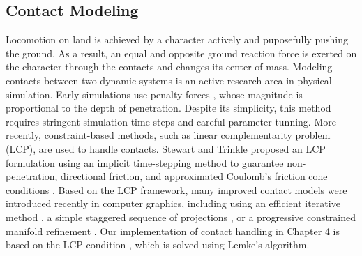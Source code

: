 \subsection{Contact Modeling}
Locomotion on land is achieved by a character actively and puposefully pushing the ground. As a result, an equal and opposite ground reaction force is exerted on the character through the contacts and changes its center of mass. Modeling contacts between two dynamic systems is an active research area in physical simulation. Early simulations use penalty forces \cite{Terzopoulos:1987}, whose magnitude is proportional to the depth of penetration. Despite its simplicity, this method requires stringent simulation time steps and careful parameter tunning. More recently, constraint-based methods, such as linear complementarity problem (LCP), are used to handle contacts. Stewart and Trinkle proposed an
LCP formulation using an implicit time-stepping method to guarantee
non-penetration, directional friction, and approximated Coulomb's
friction cone conditions \cite{Stewart:1996}. Based on the LCP
framework, many improved contact models were introduced recently in
computer graphics, including using an efficient iterative method
\cite{Erleben:2007}, a simple staggered sequence of projections
\cite{Kaufman:2008}, or a progressive constrained manifold
refinement \cite{Otaduy:2009}. Our implementation of contact handling in Chapter 4 is based on the LCP condition \cite{Tan:2012}, which is solved using Lemke's algorithm.

